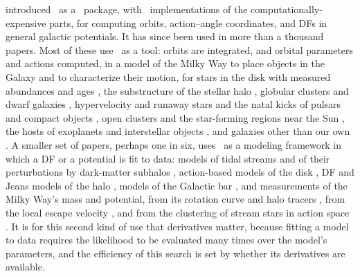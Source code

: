 \citet{Bovy2015} introduced \galpy\ as a \python\ package, with \cc\
implementations of the computationally-expensive parts, for computing orbits,
action--angle coordinates, and DFs in general galactic potentials. It has
since been used in more than a thousand papers. %
Most of
these use \galpy\ as a tool: orbits are integrated, and orbital
parameters and actions computed, in a model of the
Milky Way to place objects in the Galaxy and to characterize their
motion, for stars in the disk with
measured abundances and ages \citep[\eg,][]{Frankel2020,Xiang2022},
the substructure of the stellar halo \citep[\eg,][]{Belokurov2020,
Lane2023}, globular clusters and dwarf galaxies \citep[\eg,][]{Fritz2018,
Pace2022}, hypervelocity and runaway stars and the natal kicks of
pulsars and compact objects \citep[\eg,][]{Boubert2018,Marchetti2022,
ODoherty2023}, open clusters and the star-forming regions near the
Sun \citep[\eg,][]{Zucker2022,Swiggum2024}, the hosts of exoplanets
and interstellar objects \citep[\eg,][]{Stefansson2023,Forbes2025},
and galaxies other than our own \citep[\eg,][]{Tonnesen2019}. A
smaller set of papers, perhaps one in six, uses \galpy\ as a modeling
framework in which a DF or a potential is fit to data: models of tidal
streams and of their perturbations by dark-matter subhalos
\citep[\eg,][]{Bovy2016,Malhan2019,Banik2021}, action-based models of
the disk \citep[\eg,][]{Trick2016,Mackereth2019}, DF and Jeans models
of the halo \citep[\eg,][]{Lane2023}, models of the Galactic bar
\citep[\eg,][]{Hunt2018,Lucey2023}, and measurements of the Milky Way's
mass and potential, from its rotation curve and halo tracers
\citep[\eg,][]{Cautun2020}, from the local escape velocity
\citep[\eg,][]{Necib2022}, and from the clustering of stream stars in
action space \citep[\eg,][]{Yang2020,Reino2021}. It is for this second
kind of use that derivatives matter, because fitting a model to data
requires the likelihood to be evaluated many times over the model's
parameters, and the efficiency of this search is set by whether its
derivatives are available.

